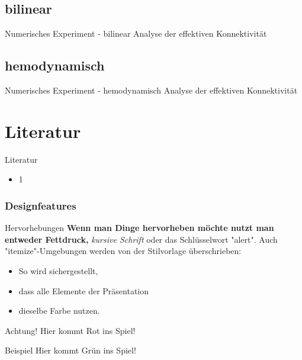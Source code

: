 \documentclass{beamer}
\begin{document}
\subsection{bilinear}
	\begin{frame}{Numerisches Experiment - bilinear}
		Analyse der effektiven Konnektivität
	\end{frame}
\subsection{hemodynamisch}
	\begin{frame}{Numerisches Experiment - hemodynamisch}
		Analyse der effektiven Konnektivität
	\end{frame}

\section{Literatur}
	\begin{frame}{Literatur}
		\begin{itemize}
			\item 1
		\end{itemize}
	\end{frame}



\begin{frame}
	\frametitle{Designfeatures}
	\begin{block}{Hervorhebungen}
	 \textbf{Wenn man Dinge hervorheben möchte nutzt man entweder Fettdruck,} \textit{ kursive Schrift} \alert{ oder das Schlüsselwort "alert"}. Auch "itemize"-Umgebungen werden von der Stilvorlage überschrieben:
	\end{block}
	\pause
	\begin{itemize}
	 \item So wird sichergestellt,
	 \item dass alle Elemente der Präsentation 
	 \item dieselbe Farbe nutzen.
	\end{itemize}
	\begin{alertblock}{Achtung!}
	 Hier kommt Rot ins Spiel!	
	\end{alertblock}
	\begin{exampleblock}{Beispiel}
	 Hier kommt Grün ins Spiel!
	\end{exampleblock}
\end{frame}
\end{document}
